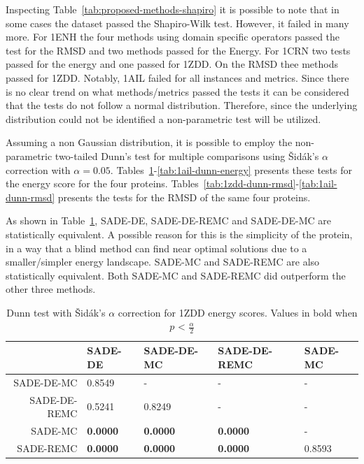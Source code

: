 Inspecting Table~\ref{tab:proposed-methods-shapiro} it is possible to note that in some cases
the dataset passed the Shapiro-Wilk test. However, it failed in many more. For 1ENH 
the four methods using domain specific operators passed the test for the \ac{RMSD} and
two methods passed for the Energy. For 1CRN two tests passed for the energy and one passed for
1ZDD. On the \ac{RMSD} thee methods passed for 1ZDD. Notably, 1AIL failed for all instances and metrics.
Since there is no clear trend on what methods/metrics passed the tests it can be considered
that the tests do not follow a normal distribution. Therefore, since the underlying distribution
could not be identified a non-parametric test will be utilized.

Assuming a non Gaussian distribution, it is possible to employ the non-parametric two-tailed
Dunn's test for multiple comparisons using \v{S}idák's $\alpha$ correction with $\alpha = 0.05$.
Tables~\ref{tab:1zdd-dunn-energy}-\ref{tab:1ail-dunn-energy} presents these tests for the
energy score for the four proteins. Tables~\ref{tab:1zdd-dunn-rmsd}-\ref{tab:1ail-dunn-rmsd}
presents the tests for the \ac{RMSD} of the same four proteins.


As shown in Table~\ref{tab:1zdd-dunn-energy}, SADE-DE, SADE-DE-REMC and SADE-DE-MC
are statistically equivalent.
A possible reason for this is the simplicity of the protein, in a way that a blind method
can find near optimal solutions due to a smaller/simpler energy landscape.
SADE-MC and SADE-REMC are also statistically equivalent.
Both SADE-MC and SADE-REMC did outperform the other three methods.


\begin{table}[ht!]
  \centering
  \begin{tabular}{ r | l | l | l | l } \cline{2-5}
              & SADE-DE         & SADE-DE-MC      & SADE-DE-REMC    & SADE-MC \\ \hline \hline
SADE-DE-MC    & 0.8549          & -               & -               & -       \\ \hline
SADE-DE-REMC  & 0.5241          & 0.8249          & -               & -       \\ \hline
SADE-MC       & \textbf{0.0000} & \textbf{0.0000} & \textbf{0.0000} & -       \\ \hline
SADE-REMC     & \textbf{0.0000} & \textbf{0.0000} & \textbf{0.0000} & 0.8593  \\ \hline \hline
  \end{tabular}
  \caption{Dunn test with \v{S}idák's $\alpha$ correction for 1ZDD energy scores. Values in bold when $p$ < $\frac{\alpha}{2}$}
  \label{tab:1zdd-dunn-energy}
\end{table}

